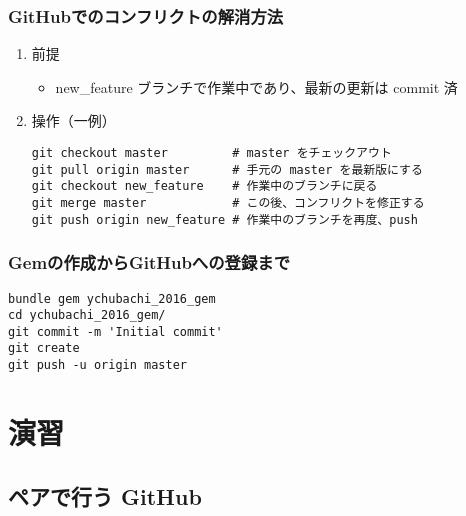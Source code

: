 \documentclass[a4paper,twoside,twocolumn]{bxjsarticle}
\begin{document}
\subsubsection{GitHubでのコンフリクトの解消方法}
\label{sec-2-2-7}
\begin{enumerate}
\item 前提
\label{sec-2-2-7-1}
\begin{itemize}
\item new\_feature ブランチで作業中であり、最新の更新は commit 済
\end{itemize}

\item 操作（一例）
\label{sec-2-2-7-2}

\begin{verbatim}
git checkout master         # master をチェックアウト
git pull origin master      # 手元の master を最新版にする
git checkout new_feature    # 作業中のブランチに戻る
git merge master            # この後、コンフリクトを修正する
git push origin new_feature # 作業中のブランチを再度、push
\end{verbatim}
\end{enumerate}


\subsubsection{Gemの作成からGitHubへの登録まで}
\label{sec-2-2-8}

\begin{verbatim}
bundle gem ychubachi_2016_gem
cd ychubachi_2016_gem/
git commit -m 'Initial commit'
git create
git push -u origin master
\end{verbatim}

\section{演習}
\label{sec-3}
\subsection{ペアで行う GitHub}
\label{sec-3-1}
\end{document}
